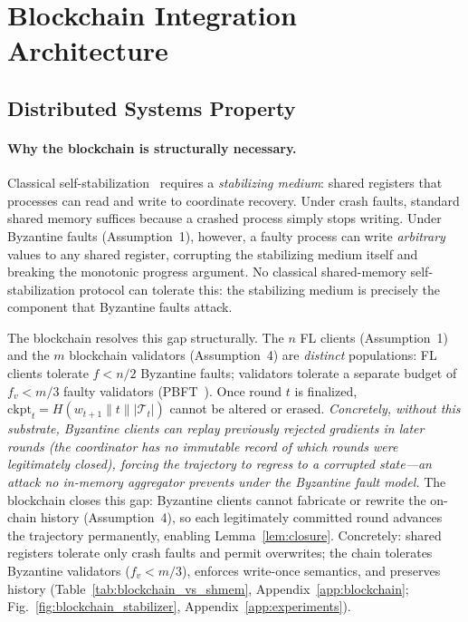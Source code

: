\section{Blockchain Integration Architecture}
\label{sec:blockchain}

\subsection{Distributed Systems Property}

\paragraph{Why the blockchain is structurally necessary.}
Classical self-stabilization~\cite{dijkstra_self_stab,dolev_self_stab} requires a
\emph{stabilizing medium}: shared registers that processes can read and write to
coordinate recovery.
Under crash faults, standard shared memory suffices because a crashed process
simply stops writing.
Under Byzantine faults (Assumption~1), however, a faulty process can write
\emph{arbitrary} values to any shared register, corrupting the stabilizing medium
itself and breaking the monotonic progress argument.
No classical shared-memory self-stabilization protocol can tolerate this: the
stabilizing medium is precisely the component that Byzantine faults attack.

The blockchain resolves this gap structurally.
The $n$ FL clients (Assumption~1) and the $m$ blockchain validators (Assumption~4) are
\emph{distinct} populations: FL clients tolerate $f < n/2$ Byzantine faults; validators
tolerate a separate budget of $f_v < m/3$ faulty validators (PBFT~\cite{bft_consensus}).
Once round $t$ is finalized, $\mathrm{ckpt}_t = H(w_{t+1} \| t \| |\mathcal{T}_t|)$
cannot be altered or erased.
\emph{Concretely, without this substrate, Byzantine clients can replay previously
rejected gradients in later rounds (the coordinator has no immutable record of which
rounds were legitimately closed), forcing the trajectory to regress to a corrupted
state---an attack no in-memory aggregator prevents under the Byzantine fault model.}
The blockchain closes this gap: Byzantine clients cannot fabricate or rewrite the
on-chain history (Assumption~4), so each legitimately committed round advances the
trajectory permanently, enabling Lemma~\ref{lem:closure}.
Concretely: shared registers tolerate only crash faults and permit overwrites; the chain
tolerates Byzantine validators ($f_v{<}m/3$), enforces write-once semantics, and preserves
history (Table~\ref{tab:blockchain_vs_shmem}, Appendix~\ref{app:blockchain};
Fig.~\ref{fig:blockchain_stabilizer}, Appendix~\ref{app:experiments}).

